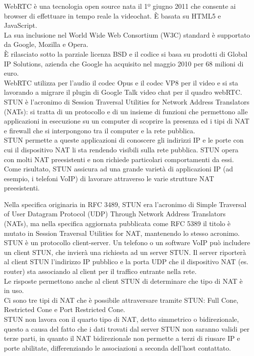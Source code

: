 \documentclass[11pt, a4paper, titlepage, block]{article}
\begin{document}
WebRTC è una tecnologia open source nata il 1º giugno 2011 che consente ai browser di effettuare in tempo reale la videochat. È basata su HTML5 e JavaScript.\\
La sua inclusione nel World Wide Web Consortium (W3C) standard è supportato da Google, Mozilla e Opera.\\
È rilasciato sotto la parziale licenza BSD e il codice si basa su prodotti di Global IP Solutions, azienda che Google ha acquisito nel maggio 2010 per 68 milioni di euro.\\
WebRTC utilizza per l'audio il codec Opus e il codec VP8 per il video e si sta lavorando a migrare il plugin di Google Talk video chat per il quadro webRTC.
\\
STUN è l'acronimo di Session Traversal Utilities for Network Address Translators (NATs): si tratta di un protocollo e di un insieme di funzioni che permettono alle applicazioni in esecuzione su un computer di scoprire la presenza ed i tipi di NAT e firewall che si interpongono tra il computer e la rete pubblica.\\
STUN permette a queste applicazioni di conoscere gli indirizzi IP e le porte con cui il dispositivo NAT li sta rendendo visibili sulla rete pubblica. STUN opera con molti NAT preesistenti e non richiede particolari comportamenti da essi.\\
Come risultato, STUN assicura ad una grande varietà di applicazioni IP (ad esempio, i telefoni VoIP) di lavorare attraverso le varie strutture NAT preesistenti.

Nella specifica originaria in RFC 3489, STUN era l'acronimo di Simple Traversal of User Datagram Protocol (UDP) Through Network Address Translators (NATs), ma nella specifica aggiornata pubblicata come RFC 5389 il titolo è mutato in Session Traversal Utilities for NAT, mantenendo lo stesso acronimo.\\

STUN è un protocollo client-server. Un telefono o un software VoIP può includere un client STUN, che invierà una richiesta ad un server STUN. Il server riporterà al client STUN l'indirizzo IP pubblico e la porta UDP che il dispositivo NAT (es. router) sta associando al client per il traffico entrante nella rete.\\
Le risposte permettono anche al client STUN di determinare che tipo di NAT è in uso.\\
Ci sono tre tipi di NAT che è possibile attraversare tramite STUN: Full Cone, Restricted Cone e Port Restricted Cone.\\
STUN non lavora con il quarto tipo di NAT, detto simmetrico o bidirezionale, questo a causa del fatto che i dati trovati dal server STUN non saranno validi per terze parti, in quanto il NAT bidirezionale non permette a terzi di riusare IP e porte abilitate, differenziando le associazioni a seconda dell'host contattato.\\
\end{document}
